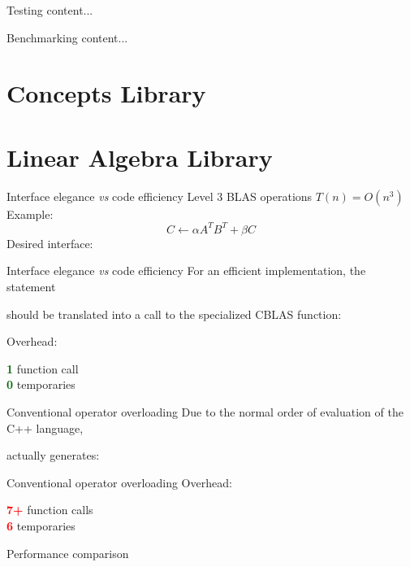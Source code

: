 \documentclass{beamer}
\begin{document}
\begin{frame}{Testing}
	content...
\end{frame}

\begin{frame}{Benchmarking}
	content...
\end{frame}

\section{Concepts Library}

\section{Linear Algebra Library}

\begin{frame}[fragile]{Interface elegance \textit{vs} code efficiency}
	Level 3 BLAS operations $T(n) = O(n^3)$\\
	Example:
	\begin{equation}
		C \leftarrow \alpha A^T B^T + \beta C
	\end{equation}
	Desired interface:
	
\end{frame}

\begin{frame}[fragile]{Interface elegance \textit{vs} code efficiency}
	For an efficient implementation, the statement
	
	should be translated into a call to the specialized CBLAS function:
	
	Overhead: \\
	\begin{center}
		\textcolor{DarkGreen}{\textbf{1}} function call\\
		\textcolor{DarkGreen}{\textbf{0}} temporaries
	\end{center}
\end{frame}

\begin{frame}{Conventional operator overloading}
	Due to the normal order of evaluation of the C++ language,
	
	
	actually generates:
	
\end{frame}

\begin{frame}{Conventional operator overloading}
	Overhead: \\
	\begin{center}
		\textcolor{red}{\textbf{7+}} function calls\\
		\textcolor{red}{\textbf{6}} temporaries
	\end{center}
\end{frame}

\begin{frame}{Performance comparison}
	
\end{frame}
\end{document}
